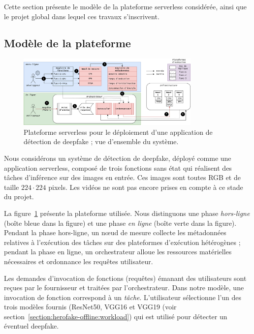 Cette section présente le modèle de la plateforme serverless considérée, ainsi que le projet global dans lequel ces travaux s'inscrivent.

\subsection{Modèle de la plateforme}

\begin{figure}[!ht]
    \centering
    \includegraphics[width=0.8\textwidth]{4_Chapitre4/figures/placement.png}
    \caption{Plateforme serverless pour le déploiement d'une application de détection de deepfake ; vue d'ensemble du système.}
    \label{figure:herofake-placement}
\end{figure}

Nous considérons un système de détection de deepfake, déployé comme une application serverless, composé de trois fonctions sans état qui réalisent des tâches d'inférence sur des images en entrée. Ces images sont toutes RGB et de taille $224 \cdot 224$ pixels. Les vidéos ne sont pas encore prises en compte à ce stade du projet.

La figure~\ref{figure:herofake-placement} présente la plateforme utilisée. Nous distinguons une phase \textit{hors-ligne} (boîte bleue dans la figure) et une phase \textit{en ligne} (boîte verte dans la figure). Pendant la phase hors-ligne, un nœud de mesure collecte les métadonnées relatives à l'exécution des tâches sur des plateformes d'exécution hétérogènes ; pendant la phase en ligne, un orchestrateur alloue les ressources matérielles nécessaires et ordonnance les requêtes utilisateur.

Les demandes d'invocation de fonctions (requêtes) émanant des utilisateurs sont reçues par le fournisseur et traitées par l'orchestrateur. Dans notre modèle, une invocation de fonction correspond à un \textit{tâche}. L'utilisateur sélectionne l'un des trois modèles fournis (ResNet50, VGG16 et VGG19 (voir section~\ref{section:herofake-offline:workload}) qui est utilisé pour détecter un éventuel deepfake.

